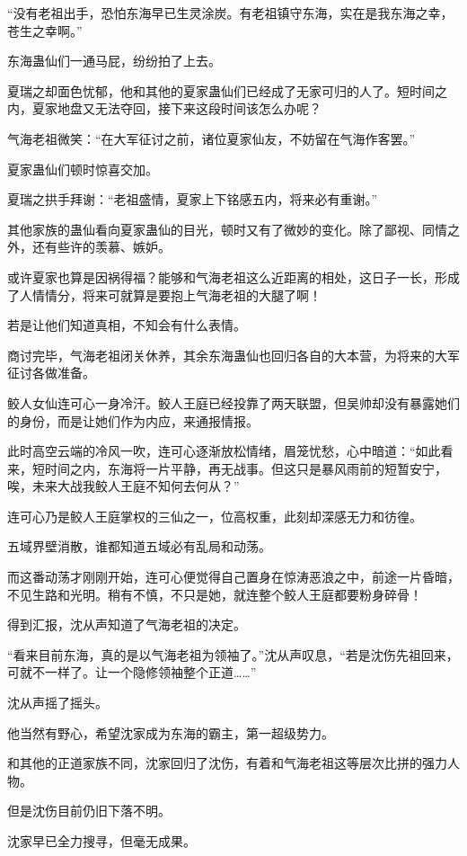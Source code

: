 \begin{this_body}
“没有老祖出手，恐怕东海早已生灵涂炭。有老祖镇守东海，实在是我东海之幸，苍生之幸啊。”

东海蛊仙们一通马屁，纷纷拍了上去。

夏瑞之却面色忧郁，他和其他的夏家蛊仙们已经成了无家可归的人了。短时间之内，夏家地盘又无法夺回，接下来这段时间该怎么办呢？

气海老祖微笑：“在大军征讨之前，诸位夏家仙友，不妨留在气海作客罢。”

夏家蛊仙们顿时惊喜交加。

夏瑞之拱手拜谢：“老祖盛情，夏家上下铭感五内，将来必有重谢。”

其他家族的蛊仙看向夏家蛊仙的目光，顿时又有了微妙的变化。除了鄙视、同情之外，还有些许的羡慕、嫉妒。

或许夏家也算是因祸得福？能够和气海老祖这么近距离的相处，这日子一长，形成了人情情分，将来可就算是要抱上气海老祖的大腿了啊！

若是让他们知道真相，不知会有什么表情。

商讨完毕，气海老祖闭关休养，其余东海蛊仙也回归各自的大本营，为将来的大军征讨各做准备。

鲛人女仙连可心一身冷汗。鲛人王庭已经投靠了两天联盟，但吴帅却没有暴露她们的身份，而是让她们作为内应，来通报情报。

此时高空云端的冷风一吹，连可心逐渐放松情绪，眉笼忧愁，心中暗道：“如此看来，短时间之内，东海将一片平静，再无战事。但这只是暴风雨前的短暂安宁，唉，未来大战我鲛人王庭不知何去何从？”

连可心乃是鲛人王庭掌权的三仙之一，位高权重，此刻却深感无力和彷徨。

五域界壁消散，谁都知道五域必有乱局和动荡。

而这番动荡才刚刚开始，连可心便觉得自己置身在惊涛恶浪之中，前途一片昏暗，不见生路和光明。稍有不慎，不只是她，就连整个鲛人王庭都要粉身碎骨！

得到汇报，沈从声知道了气海老祖的决定。

“看来目前东海，真的是以气海老祖为领袖了。”沈从声叹息，“若是沈伤先祖回来，可就不一样了。让一个隐修领袖整个正道……”

沈从声摇了摇头。

他当然有野心，希望沈家成为东海的霸主，第一超级势力。

和其他的正道家族不同，沈家回归了沈伤，有着和气海老祖这等层次比拼的强力人物。

但是沈伤目前仍旧下落不明。

沈家早已全力搜寻，但毫无成果。


\end{this_body}
